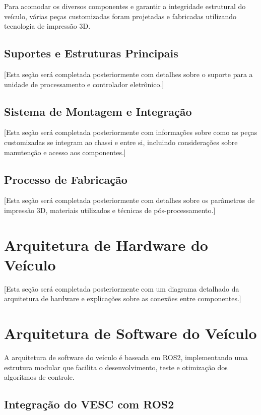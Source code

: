 Para acomodar os diversos componentes e garantir a integridade estrutural do
veículo, várias peças customizadas foram projetadas e fabricadas utilizando
tecnologia de impressão 3D.

\subsection{Suportes e Estruturas Principais}

[Esta seção será completada posteriormente com detalhes sobre o suporte para a unidade de processamento e controlador eletrônico.]

\subsection{Sistema de Montagem e Integração}

[Esta seção será completada posteriormente com informações sobre como as peças customizadas se integram ao chassi e entre si, incluindo considerações sobre manutenção e acesso aos componentes.]

\subsection{Processo de Fabricação}

[Esta seção será completada posteriormente com detalhes sobre os parâmetros de impressão 3D, materiais utilizados e técnicas de pós-processamento.]

\section{Arquitetura de Hardware do Veículo}

 [Esta seção será completada posteriormente com um diagrama detalhado da arquitetura de hardware e explicações sobre as conexões entre componentes.]

\section{Arquitetura de Software do Veículo}

A arquitetura de software do veículo é baseada em ROS2, implementando uma
estrutura modular que facilita o desenvolvimento, teste e otimização dos
algoritmos de controle.

\subsection{Integração do VESC com ROS2}

